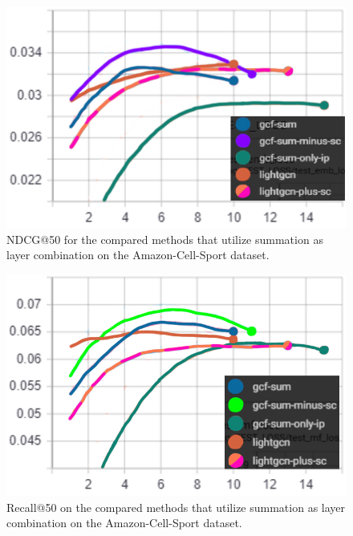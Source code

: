 \begin{figure}[]
    \includegraphics[width=\linewidth]{figures/amazon-cell-sport-gcf-sum-ndcg.png}
    \caption{NDCG@50 for the compared methods that utilize summation as layer combination on the Amazon-Cell-Sport dataset.}
    \label{fig:GCF-sum-NDCG-ablation-study-Amazon-Cell-Sport}
\end{figure}
\begin{figure}[]
    \includegraphics[width=\linewidth]{figures/amazon-cell-sport-gcf-sum-recall.png}
    \caption{Recall@50 on the compared methods that utilize summation as layer combination on the Amazon-Cell-Sport dataset.}
    \label{fig:GCF-sum-recall-ablation-study-Amazon-Cell-Sport}
\end{figure}
